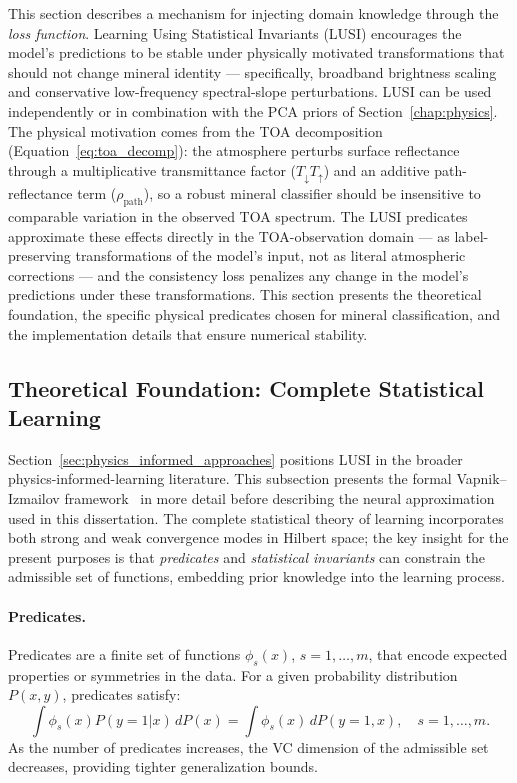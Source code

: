 \documentclass[11pt]{report}
\begin{document}
This section describes a mechanism for injecting domain knowledge through the \emph{loss function}. Learning Using Statistical Invariants (LUSI) encourages the model's predictions to be stable under physically motivated transformations that should not change mineral identity --- specifically, broadband brightness scaling and conservative low-frequency spectral-slope perturbations. LUSI can be used independently or in combination with the PCA priors of Section~\ref{chap:physics}. The physical motivation comes from the TOA decomposition (Equation~\ref{eq:toa_decomp}): the atmosphere perturbs surface reflectance through a multiplicative transmittance factor ($T_{\downarrow} T_{\uparrow}$) and an additive path-reflectance term ($\rho_{\text{path}}$), so a robust mineral classifier should be insensitive to comparable variation in the observed TOA spectrum. The LUSI predicates approximate these effects directly in the TOA-observation domain --- as label-preserving transformations of the model's input, not as literal atmospheric corrections --- and the consistency loss penalizes any change in the model's predictions under these transformations. This section presents the theoretical foundation, the specific physical predicates chosen for mineral classification, and the implementation details that ensure numerical stability.

\subsection{Theoretical Foundation: Complete Statistical Learning}

Section~\ref{sec:physics_informed_approaches} positions LUSI in the broader physics-informed-learning literature. This subsection presents the formal Vapnik--Izmailov framework~\cite{vapnik2020} in more detail before describing the neural approximation used in this dissertation. The complete statistical theory of learning incorporates both strong and weak convergence modes in Hilbert space; the key insight for the present purposes is that \emph{predicates} and \emph{statistical invariants} can constrain the admissible set of functions, embedding prior knowledge into the learning process.

\paragraph{Predicates.}
Predicates are a finite set of functions $\phi_s(x)$, $s = 1, \ldots, m$, that encode expected properties or symmetries in the data. For a given probability distribution $P(x, y)$, predicates satisfy:
\[
\int \phi_s(x) P(y = 1 | x) \, dP(x) = \int \phi_s(x) \, dP(y = 1, x), \quad s = 1, \ldots, m.
\]
As the number of predicates increases, the VC dimension of the admissible set decreases, providing tighter generalization bounds.
\end{document}
